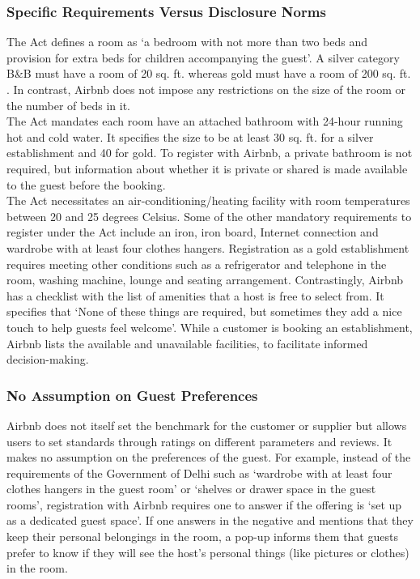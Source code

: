 \documentclass[a4paper, 12pt]{article}
\begin{document}
	\subsubsection{Specific Requirements Versus Disclosure Norms}
The Act defines a room as ‘a bedroom with not more than two beds and provision for extra beds for children accompanying the guest’. A silver category B\&B must have a room of 20 sq. ft. whereas gold must have a room of 200 sq. ft. . In contrast, Airbnb does not impose any restrictions on the size of the room or the number of beds in it.\\

The Act mandates each room have an attached bathroom with 24-hour running hot and cold water. It specifies the size to be at least 30 sq. ft. for a silver establishment and 40 for gold. To register with Airbnb, a private bathroom is not required, but information about whether it is private or shared is made available to the guest before the booking.\\

The Act necessitates an air-conditioning/heating facility with room temperatures between 20 and 25 degrees Celsius. Some of the other mandatory requirements to register under the Act include an iron, iron board, Internet connection and wardrobe with at least four clothes hangers. Registration as a gold establishment requires meeting other conditions such as a refrigerator and telephone in the room, washing machine, lounge and seating arrangement. Contrastingly, Airbnb has a checklist with the list of amenities that a host is free to select from. It specifies that ‘None of these things are required, but sometimes they add a nice touch to help guests feel welcome’. While a customer is booking an establishment, Airbnb lists the available and unavailable facilities, to facilitate informed decision-making.\\


                    \subsubsection{No Assumption on Guest Preferences}
                    Airbnb does not itself set the benchmark for the customer or supplier but allows users to set standards through ratings on different parameters and reviews. It makes no assumption on the preferences of the guest. For example, instead of the requirements of the Government of Delhi such as ‘wardrobe with at least four clothes hangers in the guest room’ or ‘shelves or drawer space in the guest rooms’, registration with Airbnb requires one to answer if the offering is ‘set up as a dedicated guest space’. If one answers in the negative and mentions that they keep their personal belongings in the room, a pop-up informs them that guests prefer to know if they will see the host’s personal things (like pictures or clothes) in the room.\\
\end{document}
